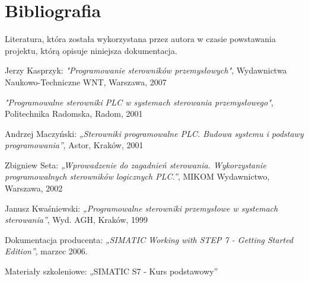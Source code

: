\section{Bibliografia}
Literatura, która została wykorzystana przez autora w czasie powstawania projektu, którą opisuje niniejsza dokumentacja.

\begin{thebibliography}{99}
{} 
Jerzy Kasprzyk: 
\emph{"Programowanie sterowników przemysłowych"},
Wydawnictwa Naukowo-Techniczne WNT, 
Warszawa, 
2007      

\emph{"Programowalne sterowniki PLC w systemach sterowania przemysłowego"}, 
Politechnika Radomska, 
Radom,
2001

Andrzej Maczyński:
\emph{„Sterowniki programowalne PLC. Budowa systemu i podstawy programowania”},
Astor, 
Kraków,
2001 

Zbigniew Seta: 
\emph{„Wprowadzenie do zagadnień sterowania. Wykorzystanie programowalnych sterowników logicznych PLC.”},
MIKOM Wydawnictwo, 
Warszawa,
2002 

Janusz Kwaśniewski: 
\emph{„Programowalne sterowniki przemysłowe w systemach sterowania”}, 
Wyd. AGH, 
Kraków,
1999

Dokumentacja producenta: 
\emph{„SIMATIC Working with STEP 7 - Getting Started Edition”}, 
marzec 2006.

Materiały szkoleniowe:
„SIMATIC S7 - Kurs podstawowy”

\end{thebibliography}

